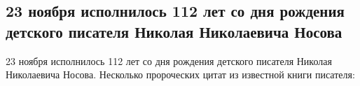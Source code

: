  
 
 
 
 
 
\subsection{23 ноября исполнилось 112 лет со дня рождения детского писателя Николая Николаевича Носова}
\label{sec:24_11_2020.fb.maslov_evgenij.1.nikolaj_nosov}


23 ноября исполнилось 112 лет со дня рождения детского писателя Николая Николаевича Носова.
Несколько пророческих цитат из известной книги писателя:

